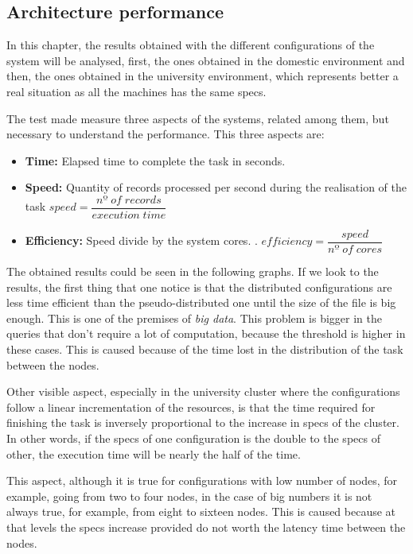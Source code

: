 \subsection{Architecture performance}
In this chapter, the results obtained with the different configurations of the system will be analysed, first, the ones obtained in the domestic environment and then, the ones obtained in the university environment, which represents better a real situation as all the machines has the same specs.

The test made measure three aspects of the systems, related among them, but necessary to understand the performance. This three aspects are:

\begin{itemize}
	\item \textbf{Time:} Elapsed time to complete the task in seconds.
	\item \textbf{Speed:} Quantity of records processed per second during the realisation of the task $speed = \dfrac{nº \; of \; records}{execution \; time}$
	\item \textbf{Efficiency:} Speed divide by the system cores. \cite{eficiencia}. $efficiency = \dfrac{speed}{nº \; of \; cores}$
\end{itemize}

The obtained results could be seen in the following graphs. If we look to the results, the first thing that one notice is that the distributed configurations are less time efficient than the pseudo-distributed one until the size of the file is big enough. This is one of the premises of \textit{big data}. This problem is bigger in the queries that don’t require a lot of computation, because the threshold is higher in these cases. This is caused because of the time lost in the distribution of the task between the nodes.

Other visible aspect, especially in the university cluster where the configurations follow a linear incrementation of the resources, is that the time required for finishing the task is inversely proportional to the increase in specs of the cluster. In other words, if the specs of one configuration is the double to the specs of other, the execution time will be nearly the half of the time.

This aspect, although it is true for configurations with low number of nodes, for example, going from two to four nodes, in the case of big numbers it is not always true, for example, from eight to sixteen nodes. This is caused because at that levels the specs increase provided do not worth the latency time between the nodes.

